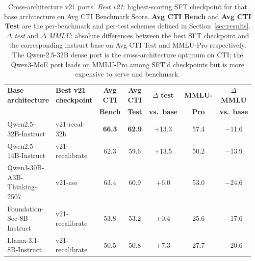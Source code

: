 \documentclass[conference]{IEEEtran}
\begin{document}
\begin{table}[t]
\centering
\caption{Cross-architecture v21 ports. \emph{Best v21}: highest-scoring SFT checkpoint for that base architecture on Avg CTI Benchmark Score. \textbf{Avg CTI Bench} and \textbf{Avg CTI Test} are the per-benchmark and per-test schemes defined in Section~\ref{sec:results}. \emph{$\Delta$ test} and \emph{$\Delta$ MMLU}: absolute differences between the best SFT checkpoint and the corresponding instruct base on Avg CTI Test and MMLU-Pro respectively. The Qwen-2.5-32B dense port is the cross-architecture optimum on CTI; the Qwen3-MoE port leads on MMLU-Pro among SFT'd checkpoints but is more expensive to serve and benchmark.}
\label{tab:results-architectures}
\small
\setlength{\tabcolsep}{4pt}
\begin{tabular}{llccccc}
\hline
\textbf{Base architecture}  & \textbf{Best v21 checkpoint} & \textbf{Avg CTI} & \textbf{Avg CTI} & \textbf{$\Delta$ test} & \textbf{MMLU-} & \textbf{$\Delta$ MMLU} \\
                            &                              & \textbf{Bench}   & \textbf{Test}    & \textbf{vs.\ base}     & \textbf{Pro}   & \textbf{vs.\ base}     \\
\hline
Qwen2.5-32B-Instruct        & v21-recal-32b   & \textbf{66.3} & \textbf{62.9} & +13.3 & 57.4 & $-$11.6 \\
Qwen2.5-14B-Instruct        & v21-recalibrate & 62.3 & 59.6 & +13.5 & 50.2 & $-$13.9 \\
Qwen3-30B-A3B-Thinking-2507 & v21-cse         & 63.4 & 60.9 &  +6.0 & 53.0 & $-$24.6 \\
Foundation-Sec-8B-Instruct  & v21-recalibrate & 53.8 & 53.2 &  +0.4 & 25.6 & $-$17.6 \\
Llama-3.1-8B-Instruct       & v21-recalibrate & 50.5 & 50.8 &  +7.3 & 27.7 & $-$20.6 \\
\hline
\end{tabular}
\end{table}
\end{document}
